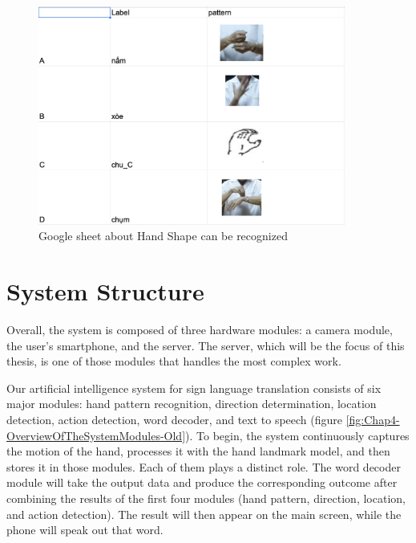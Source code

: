 \begin{figure}[H]
	\centering
	\includegraphics[width=0.9\textwidth]{img/Chap4/Sheet-Pattern.png}
	\caption{Google sheet about Hand Shape can be recognized}
	\label{fig:Chap4-Sheet-Pattern}
\end{figure}



\section{System Structure}

Overall, the system is composed of three hardware modules: a camera module, the user's smartphone, and the server. The server, which will be the focus of this thesis, is one of those modules that handles the most complex work.

Our artificial intelligence system for sign language translation consists of six major modules: hand pattern recognition, direction determination, location detection, action detection, word decoder, and text to speech (figure \ref{fig:Chap4-OverviewOfTheSystemModules-Old}). To begin, the system continuously captures the motion of the hand, processes it with the hand landmark model, and then stores it in those modules. Each of them plays a distinct role. The word decoder module will take the output data and produce the corresponding outcome after combining the results of the first four modules (hand pattern, direction, location, and action detection). The result will then appear on the main screen, while the phone will speak out that word.

